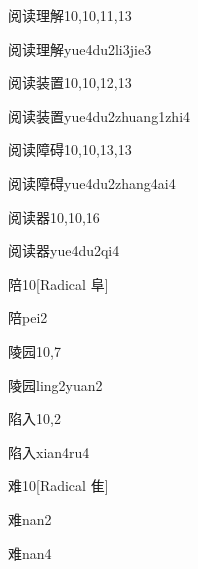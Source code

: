 \begin{entry}{阅读理解}{10,10,11,13}
  \begin{phonetics}{阅读理解}{yue4du2li3jie3}
  \end{phonetics}
\end{entry}

\begin{entry}{阅读装置}{10,10,12,13}
  \begin{phonetics}{阅读装置}{yue4du2zhuang1zhi4}
  \end{phonetics}
\end{entry}

\begin{entry}{阅读障碍}{10,10,13,13}
  \begin{phonetics}{阅读障碍}{yue4du2zhang4ai4}
  \end{phonetics}
\end{entry}

\begin{entry}{阅读器}{10,10,16}
  \begin{phonetics}{阅读器}{yue4du2qi4}
  \end{phonetics}
\end{entry}

\begin{entry}{陪}{10}[Radical 阜]
  \begin{phonetics}{陪}{pei2}
  \end{phonetics}
\end{entry}

\begin{entry}{陵园}{10,7}
  \begin{phonetics}{陵园}{ling2yuan2}
  \end{phonetics}
\end{entry}

\begin{entry}{陷入}{10,2}
  \begin{phonetics}{陷入}{xian4ru4}
  \end{phonetics}
\end{entry}

\begin{entry}{难}{10}[Radical 隹]
  \begin{phonetics}{难}{nan2}
  \end{phonetics}
  \begin{phonetics}{难}{nan4}
  \end{phonetics}
\end{entry}

